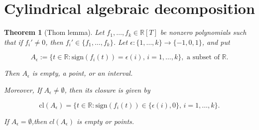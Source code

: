 \documentclass[12pt]{article}
\theoremstyle{mythm}
\newtheorem{thm}{Theorem}[section]
\begin{document}
\section{Cylindrical algebraic decomposition}
\begin{thm}[Thom lemma]
    Let \( f_1, \ldots, f_k \in \mathbb{R}[T] \) be nonzero polynomials such that if \( f_i' \neq 0 \), then \( f_i' \in \{f_1, \ldots, f_k\} \). Let \(\epsilon : \{1, \ldots, k\} \to \{-1, 0, 1\}\), and put

\[
A_\epsilon := \{t \in \mathbb{R} : \mathrm{sign}(f_i(t)) = \epsilon(i), \, i = 1, \ldots, k\}, \text{ a subset of } \mathbb{R}.
\]

Then \( A_\epsilon \) is empty, a point, or an interval.

Moreover,  If \( A_\epsilon \neq \emptyset \), then its closure is given by

\[
\mathrm{cl}(A_\epsilon) = \{t \in \mathbb{R} : \mathrm{sign}(f_i(t)) \in \{\epsilon(i), 0\}, \, i = 1, \ldots, k\}.
\]

If \( A_\epsilon = \emptyset \),then \(cl(A_\epsilon)\) is empty or points.
\end{thm}
\end{document}

